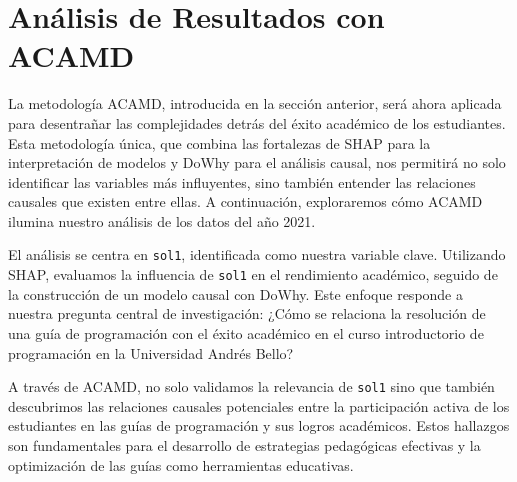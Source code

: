 \section{Análisis de Resultados con ACAMD}\label{analisis_resultados_acamd}
La metodología ACAMD, introducida en la sección anterior, será ahora aplicada para desentrañar las complejidades detrás del éxito académico de los estudiantes. Esta metodología única, que combina las fortalezas de SHAP para la interpretación de modelos y DoWhy para el análisis causal, nos permitirá no solo identificar las variables más influyentes, sino también entender las relaciones causales que existen entre ellas. A continuación, exploraremos cómo ACAMD ilumina nuestro análisis de los datos del año 2021.

El análisis se centra en \texttt{sol1}, identificada como nuestra variable clave. Utilizando SHAP, evaluamos la influencia de \texttt{sol1} en el rendimiento académico, seguido de la construcción de un modelo causal con DoWhy. Este enfoque responde a nuestra pregunta central de investigación: ¿Cómo se relaciona la resolución de una guía de programación con el éxito académico en el curso introductorio de programación en la Universidad Andrés Bello?

A través de ACAMD, no solo validamos la relevancia de \texttt{sol1} sino que también descubrimos las relaciones causales potenciales entre la participación activa de los estudiantes en las guías de programación y sus logros académicos. Estos hallazgos son fundamentales para el desarrollo de estrategias pedagógicas efectivas y la optimización de las guías como herramientas educativas.









